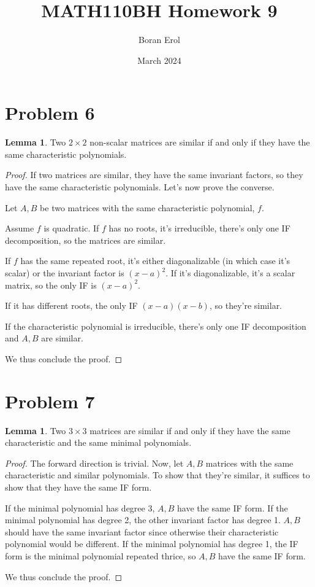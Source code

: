 \documentclass{article}
\title{MATH110BH Homework 9}
\date{March 2024}
\author{Boran Erol}
\theoremstyle{definition}
\newtheorem{lemma}[theorem]{Lemma}
\begin{document}
\maketitle

\section{Problem 6}

\begin{lemma}
    Two $2 \times 2$ non-scalar matrices are similar if and only if they have the same characteristic polynomials.
\end{lemma}
\begin{proof}
    If two matrices are similar, they have the same invariant factors, so they have the same characteristic
    polynomials. Let's now prove the converse.

    Let $A,B$ be two matrices with the same characteristic polynomial, $f$.
    
    Assume $f$ is quadratic. If $f$ has no roots, it's irreducible, there's only one IF decomposition,
    so the matrices are similar.

    If $f$ has the same repeated root, it's either diagonalizable (in which case it's scalar) or
    the invariant factor is $(x-a)^{2}$. If it's diagonalizable, it's a scalar matrix, so the only IF
    is $(x-a)^{2}$.

    If it has different roots, the only IF $(x-a)(x-b)$, so they're similar.

    If the characteristic polynomial is irreducible, there's only one IF decomposition and $A,B$ are similar. 

    We thus conclude the proof.
\end{proof}

\section{Problem 7}

\begin{lemma}
    Two $3 \times 3$ matrices are similar if and only if they have the same characteristic and the same
    minimal polynomials.
\end{lemma}
\begin{proof}
    The forward direction is trivial. Now, let $A,B$ matrices with the same characteristic and similar
    polynomials. To show that they're similar, it suffices to show that they have the same IF form.
    
    If the minimal polynomial has degree 3, $A,B$ have the same IF form.
    If the minimal polynomial has degree 2, the other invariant factor has degree 1. $A,B$ should have
    the same invariant factor since otherwise their characteristic polynomial would be different.
    If the minimal polynomial has degree 1, the IF form is the minimal polynomial repeated thrice,
    so $A,B$ have the same IF form.

    We thus conclude the proof.
\end{proof}
\end{document}
